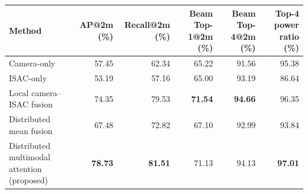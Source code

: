 \begin{tabular}{lrrrrr}
\toprule
Method & AP@2m (\%) & Recall@2m (\%) & Beam Top-1@2m (\%) & Beam Top-4@2m (\%) & Top-4 power ratio (\%) \\
\midrule
Camera-only & 57.45 & 62.34 & 65.22 & 91.56 & 95.38 \\
ISAC-only & 53.19 & 57.16 & 65.00 & 93.19 & 86.64 \\
Local camera--ISAC fusion & 74.35 & 79.53 & \textbf{71.54} & \textbf{94.66} & 96.35 \\
Distributed mean fusion & 67.48 & 72.82 & 67.10 & 92.99 & 93.84 \\
Distributed multimodal attention (proposed) & \textbf{78.73} & \textbf{81.51} & 71.13 & 94.13 & \textbf{97.01} \\
\bottomrule
\end{tabular}
